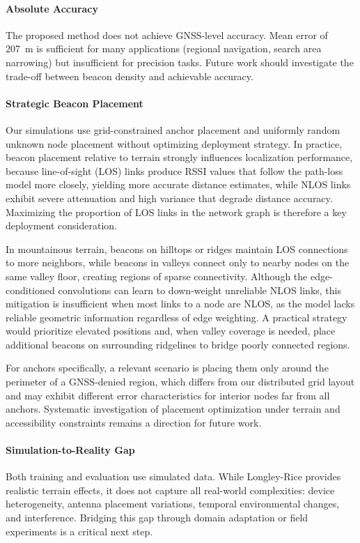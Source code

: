 \documentclass[master,final,11pt]{iscs-thesis}
\begin{document}
\paragraph{Absolute Accuracy}
The proposed method does not achieve GNSS-level accuracy.
Mean error of 207~m is sufficient for many applications (regional navigation, search area narrowing) but insufficient for precision tasks.
Future work should investigate the trade-off between beacon density and achievable accuracy.

\paragraph{Strategic Beacon Placement}
Our simulations use grid-constrained anchor placement and uniformly random unknown node placement without optimizing deployment strategy.
In practice, beacon placement relative to terrain strongly influences localization performance, because line-of-sight (LOS) links produce RSSI values that follow the path-loss model more closely, yielding more accurate distance estimates, while NLOS links exhibit severe attenuation and high variance that degrade distance accuracy.
Maximizing the proportion of LOS links in the network graph is therefore a key deployment consideration.

In mountainous terrain, beacons on hilltops or ridges maintain LOS connections to more neighbors, while beacons in valleys connect only to nearby nodes on the same valley floor, creating regions of sparse connectivity.
Although the edge-conditioned convolutions can learn to down-weight unreliable NLOS links, this mitigation is insufficient when most links to a node are NLOS, as the model lacks reliable geometric information regardless of edge weighting.
A practical strategy would prioritize elevated positions and, when valley coverage is needed, place additional beacons on surrounding ridgelines to bridge poorly connected regions.

For anchors specifically, a relevant scenario is placing them only around the perimeter of a GNSS-denied region, which differs from our distributed grid layout and may exhibit different error characteristics for interior nodes far from all anchors.
Systematic investigation of placement optimization under terrain and accessibility constraints remains a direction for future work.

\paragraph{Simulation-to-Reality Gap}
Both training and evaluation use simulated data.
While Longley-Rice provides realistic terrain effects, it does not capture all real-world complexities: device heterogeneity, antenna placement variations, temporal environmental changes, and interference.
Bridging this gap through domain adaptation or field experiments is a critical next step.
\end{document}
